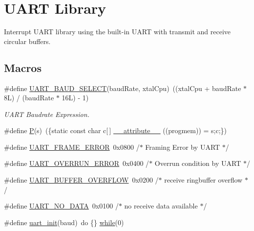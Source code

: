 \hypertarget{group__pfleury__uart}{\section{U\-A\-R\-T Library}
\label{group__pfleury__uart}
}


Interrupt U\-A\-R\-T library using the built-\/in U\-A\-R\-T with transmit and receive circular buffers.  


\subsection*{Macros}
\begin{DoxyCompactItemize}
\item 
\#define \hyperlink{group__pfleury__uart_ga367ff7b5de225ed936a63239ad4adb0b}{U\-A\-R\-T\-\_\-\-B\-A\-U\-D\-\_\-\-S\-E\-L\-E\-C\-T}(baud\-Rate, xtal\-Cpu)~((xtal\-Cpu + baud\-Rate $\ast$ 8\-L) / (baud\-Rate $\ast$ 16\-L) -\/ 1)
\begin{DoxyCompactList}\small\item\em U\-A\-R\-T Baudrate Expression. \end{DoxyCompactList}\item 
\#define \hyperlink{group__pfleury__uart_ga1bb183938acb879d5c2795cf007f8ffa}{P}(s)~(\{static const char c\mbox{[}$\,$\mbox{]} \hyperlink{OWH__DS2433__EEPROM__LCD__Sensors_8ino_a96573b623ef42a0a72e78b7cc249169a}{\-\_\-\-\_\-attribute\-\_\-\-\_\-} ((progmem)) = s;c;\})
\item 
\#define \hyperlink{group__pfleury__uart_gabcdb1041d763560cd8f8e722370dfd37}{U\-A\-R\-T\-\_\-\-F\-R\-A\-M\-E\-\_\-\-E\-R\-R\-O\-R}~0x0800              /$\ast$ Framing Error by U\-A\-R\-T       $\ast$/
\item 
\#define \hyperlink{group__pfleury__uart_ga3183177e3613d8785d8cc8516931beb6}{U\-A\-R\-T\-\_\-\-O\-V\-E\-R\-R\-U\-N\-\_\-\-E\-R\-R\-O\-R}~0x0400              /$\ast$ Overrun condition by U\-A\-R\-T   $\ast$/
\item 
\#define \hyperlink{group__pfleury__uart_ga94758f3dad6864703b7417d3e40f11df}{U\-A\-R\-T\-\_\-\-B\-U\-F\-F\-E\-R\-\_\-\-O\-V\-E\-R\-F\-L\-O\-W}~0x0200              /$\ast$ receive ringbuffer overflow $\ast$/
\item 
\#define \hyperlink{group__pfleury__uart_ga77ba544d423ff42d400220a05303f268}{U\-A\-R\-T\-\_\-\-N\-O\-\_\-\-D\-A\-T\-A}~0x0100              /$\ast$ no receive data available   $\ast$/
\item 
\#define \hyperlink{group__pfleury__uart_ga991f248e09d11f90ba4625c3d82b2db8}{uart\-\_\-init}(baud)~do \{\} \hyperlink{arm__acle_8h_ac7c3d8fa3689206398783748da75f97f}{while}(0)

\end{DoxyCompactItemize}
